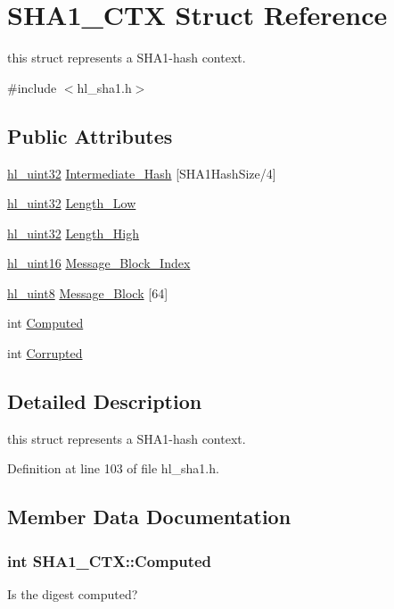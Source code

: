 \hypertarget{struct_s_h_a1___c_t_x}{
\section{SHA1\_\-CTX Struct Reference}
\label{struct_s_h_a1___c_t_x}
}


this struct represents a SHA1-\/hash context.  


{\ttfamily \#include $<$hl\_\-sha1.h$>$}\subsection*{Public Attributes}
\begin{DoxyCompactItemize}
\item 
\hyperlink{hl__types_8h_ae2fe08a06e4f429c5519ec9865f304d6}{hl\_\-uint32} \hyperlink{struct_s_h_a1___c_t_x_a002bb4717d18473dd068b0107fad99fb}{Intermediate\_\-Hash} \mbox{[}SHA1HashSize/4\mbox{]}
\item 
\hyperlink{hl__types_8h_ae2fe08a06e4f429c5519ec9865f304d6}{hl\_\-uint32} \hyperlink{struct_s_h_a1___c_t_x_ad7fa6a9c4bc5b5a973e43f295d47130b}{Length\_\-Low}
\item 
\hyperlink{hl__types_8h_ae2fe08a06e4f429c5519ec9865f304d6}{hl\_\-uint32} \hyperlink{struct_s_h_a1___c_t_x_a0cf6238687324137a7af1d551a035c5e}{Length\_\-High}
\item 
\hyperlink{hl__types_8h_a2ca38fd7cd0dbcd4c551471bea0714a0}{hl\_\-uint16} \hyperlink{struct_s_h_a1___c_t_x_a201652163346284bc0798699fb96e8df}{Message\_\-Block\_\-Index}
\item 
\hyperlink{hl__types_8h_adc1917ae5f0dc40725be12536ffe0a6c}{hl\_\-uint8} \hyperlink{struct_s_h_a1___c_t_x_a54029eb96289c03362de738f6608aa70}{Message\_\-Block} \mbox{[}64\mbox{]}
\item 
int \hyperlink{struct_s_h_a1___c_t_x_a53cdb3c7d748328da6a7cc631998ed27}{Computed}
\item 
int \hyperlink{struct_s_h_a1___c_t_x_adfe095bb242ae3900dcecf9fe137f6e8}{Corrupted}
\end{DoxyCompactItemize}


\subsection{Detailed Description}
this struct represents a SHA1-\/hash context. 

Definition at line 103 of file hl\_\-sha1.h.

\subsection{Member Data Documentation}
\hypertarget{struct_s_h_a1___c_t_x_a53cdb3c7d748328da6a7cc631998ed27}{
\subsubsection[{Computed}]{\setlength{\rightskip}{0pt plus 5cm}int {\bf SHA1\_\-CTX::Computed}}}
\label{struct_s_h_a1___c_t_x_a53cdb3c7d748328da6a7cc631998ed27}
Is the digest computed? 

